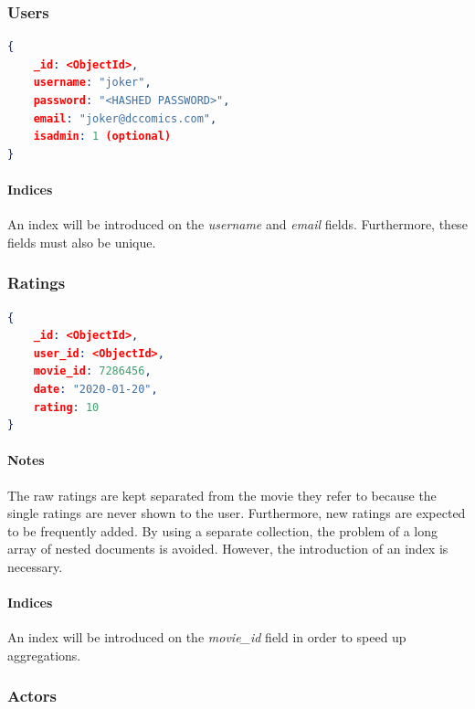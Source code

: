 \documentclass[11pt]{article}
\begin{document}
\subsubsection{Users}
\label{sec:users}

\begin{lstlisting}[language=json]	
{
	_id: <ObjectId>,
	username: "joker",
	password: "<HASHED PASSWORD>",
	email: "joker@dccomics.com",
	isadmin: 1 (optional)
}
\end{lstlisting}


\paragraph{Indices} 
An index will be introduced on the \emph{username} and \emph{email} fields. 
Furthermore, these fields must also be unique.

\subsubsection{Ratings}
\label{sec:ratings}

\begin{lstlisting}[language=json]	
{
	_id: <ObjectId>,
	user_id: <ObjectId>,
	movie_id: 7286456,
	date: "2020-01-20",
	rating: 10
}
\end{lstlisting}

\paragraph{Notes}
The raw ratings are kept separated from the movie they refer to because the single 
ratings are never shown to the user. 
Furthermore, new ratings are expected to be frequently added.
By using a separate collection, the problem of a long array of nested documents 
is avoided. However, the introduction of an index is necessary.


\paragraph{Indices} 
An index will be introduced on the \emph{movie\_id} field in order to speed up
aggregations.

\subsubsection{Actors}
\label{sec:actors}
\end{document}
